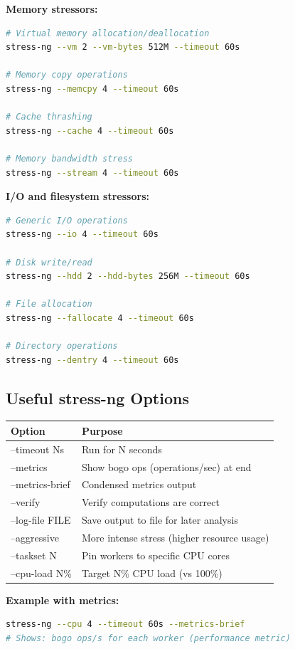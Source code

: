 \documentclass[12pt,a4paper]{report}
\begin{document}
\textbf{Memory stressors:}
\begin{lstlisting}[language=bash]
# Virtual memory allocation/deallocation
stress-ng --vm 2 --vm-bytes 512M --timeout 60s

# Memory copy operations
stress-ng --memcpy 4 --timeout 60s

# Cache thrashing
stress-ng --cache 4 --timeout 60s

# Memory bandwidth stress
stress-ng --stream 4 --timeout 60s
\end{lstlisting}

\textbf{I/O and filesystem stressors:}
\begin{lstlisting}[language=bash]
# Generic I/O operations
stress-ng --io 4 --timeout 60s

# Disk write/read
stress-ng --hdd 2 --hdd-bytes 256M --timeout 60s

# File allocation
stress-ng --fallocate 4 --timeout 60s

# Directory operations
stress-ng --dentry 4 --timeout 60s
\end{lstlisting}


\subsection{Useful stress-ng Options}

\begin{center}
\begin{tabular}{|l|p{7cm}|}
\hline
\textbf{Option} & \textbf{Purpose} \\
\hline
--timeout Ns & Run for N seconds \\
\hline
--metrics & Show bogo ops (operations/sec) at end \\
\hline
--metrics-brief & Condensed metrics output \\
\hline
--verify & Verify computations are correct \\
\hline
--log-file FILE & Save output to file for later analysis \\
\hline
--aggressive & More intense stress (higher resource usage) \\
\hline
--taskset N & Pin workers to specific CPU cores \\
\hline
--cpu-load N\% & Target N\% CPU load (vs 100\%) \\
\hline
\end{tabular}
\end{center}

\textbf{Example with metrics:}
\begin{lstlisting}[language=bash]
stress-ng --cpu 4 --timeout 60s --metrics-brief
# Shows: bogo ops/s for each worker (performance metric)
\end{lstlisting}
\end{document}
